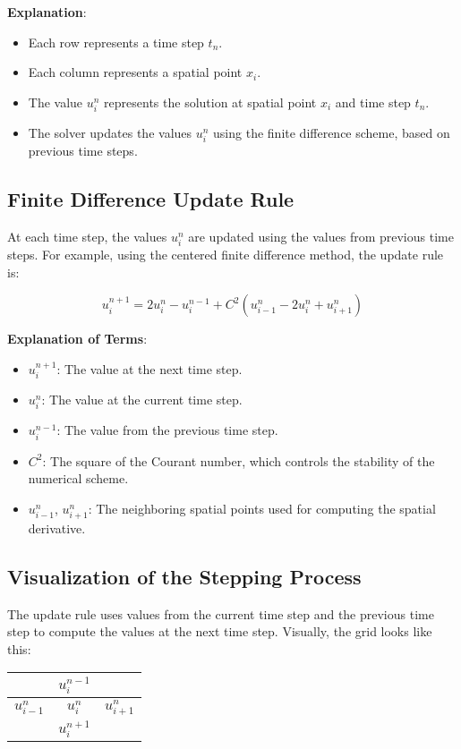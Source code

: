 \documentclass[a4paper, 11pt]{article}
\begin{document}
	\textbf{Explanation}:
	\begin{itemize}
		\item Each row represents a time step $t_n$.
		\item Each column represents a spatial point $x_i$.
		\item The value $u_i^n$ represents the solution at spatial point $x_i$ and time step $t_n$.
		\item The solver updates the values $u_i^n$ using the finite difference scheme, based on previous time steps.
	\end{itemize}
	
	\subsection{Finite Difference Update Rule}
	
	At each time step, the values $u_i^n$ are updated using the values from previous time steps. For example, using the centered finite difference method, the update rule is:
	
	\begin{equation}
		u_i^{n+1} = 2u_i^n - u_i^{n-1} + C^2 (u_{i-1}^n - 2u_i^n + u_{i+1}^n)
	\end{equation}
	
	\textbf{Explanation of Terms}:
	\begin{itemize}
		\item $u_i^{n+1}$: The value at the next time step.
		\item $u_i^n$: The value at the current time step.
		\item $u_i^{n-1}$: The value from the previous time step.
		\item $C^2$: The square of the Courant number, which controls the stability of the numerical scheme.
		\item $u_{i-1}^n$, $u_{i+1}^n$: The neighboring spatial points used for computing the spatial derivative.
	\end{itemize}
	
	\subsection{Visualization of the Stepping Process}
	
	The update rule uses values from the current time step and the previous time step to compute the values at the next time step. Visually, the grid looks like this:
	
	\begin{center}
		\begin{tabular}{|c|c|c|}
			\hline
			& $u_i^{n-1}$ & \\
			\hline
			$u_{i-1}^n$ & $u_i^n$ & $u_{i+1}^n$ \\
			\hline
			& $u_i^{n+1}$ & \\
			\hline
		\end{tabular}
	\end{center}
	
\end{document}
